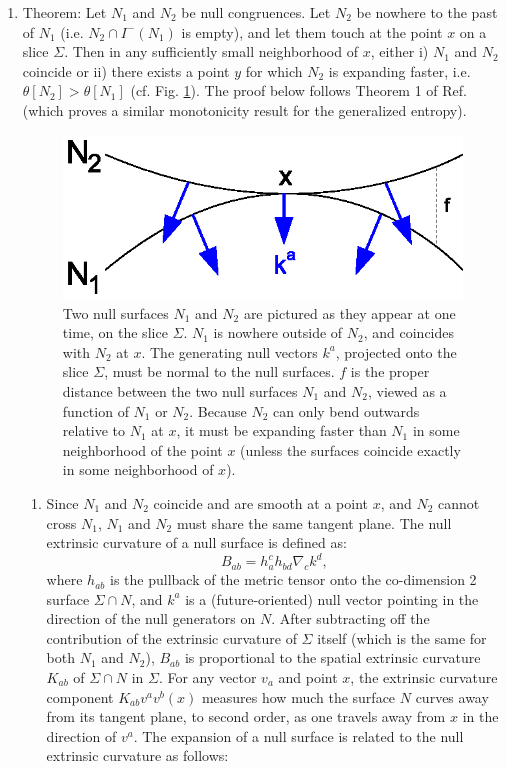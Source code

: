 \documentclass[12pt]{article}
\begin{document}
\begin{enumerate}
\item \label{thetaineq} Theorem: Let $N_1$ and $N_2$ be null congruences.  Let $N_2$ be nowhere to the past of $N_1$
(i.e. $N_2 \cap I^-(N_1)$ is empty), and let them touch at the point $x$ on a slice $\Sigma$.  Then in any sufficiently small neighborhood of $x$, either i) $N_1$ and $N_2$ coincide or ii) there exists a point $y$ for which $N_2$ is expanding faster, i.e. $\theta[N_2] > \theta[N_1]$ (cf. Fig. \ref{bend}).  The proof below follows Theorem 1 of Ref. \cite{sing} (which proves a similar monotonicity result for the generalized entropy).
\begin{figure}[hbt]
\centering
\includegraphics[width=.4\textwidth]{bend.eps}
\caption{\footnotesize Two null surfaces $N_1$ and $N_2$ are pictured as they appear at one time, on the slice $\Sigma$.  $N_1$ is nowhere outside of $N_2$, and coincides with $N_2$ at $x$.  The generating null vectors $k^a$, projected onto the slice $\Sigma$, must be normal to the null surfaces.  $f$ is the proper distance between the two null surfaces $N_1$ and $N_2$, viewed as a function of $N_1$ or $N_2$.  Because $N_2$ can only bend outwards relative to $N_1$ at $x$, it must be expanding faster than $N_1$ in some neighborhood of the point $x$ (unless the surfaces coincide exactly in some neighborhood of $x$).}\label{bend}
\end{figure}
	\begin{enumerate}
	\item Since $N_1$ and $N_2$ coincide and are smooth at a point $x$, and $N_2$ cannot cross $N_1$, $N_1$ and $N_2$ must share the same tangent plane.  The null extrinsic curvature of a null surface is defined as:
\begin{equation}\label{B}
B_{ab} = h^c_a h_{bd} \nabla_c k^d,
\end{equation} 
where $h_{ab}$ is the pullback of the metric tensor onto the co-dimension 2 surface $\Sigma \cap N$, and $k^a$ is a (future-oriented) null vector pointing in the direction of the null generators on $N$.  After subtracting off the contribution of the extrinsic curvature of $\Sigma$ itself (which is the same for both $N_1$ and $N_2$), $B_{ab}$ is proportional to the spatial extrinsic curvature $K_{ab}$ of $\Sigma \cap N$ in $\Sigma$.  For any vector $v_a$ and point $x$, the extrinsic curvature component $K_{ab} v^a v^b (x)$ measures how much the surface $N$ curves away from its tangent plane, to second order, as one travels away from $x$ in the direction of $v^a$.  The expansion of a null surface is related to the null extrinsic curvature as follows:

\end{enumerate}
\end{enumerate}
\end{document}
